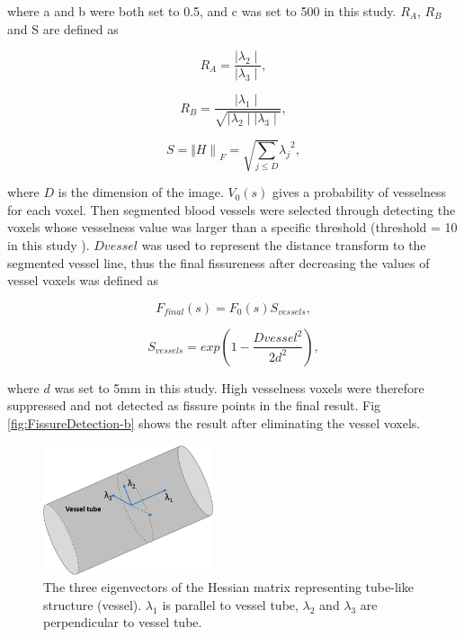{\noindent where a and b were both set to 0.5, and c was set to 500 in this study. $R_A$, $R_B$ and S are defined as

\begin{equation}
\label{eq:VesselHessian2}
R_A = \frac{\mid\lambda_{2}\mid}{\mid\lambda_{3}\mid}, 
\end{equation}

\begin{equation}
\label{eq:VesselHessian3}
R_B = \frac{\mid\lambda_{1}\mid}{\sqrt{\mid\lambda_{2}\mid \mid\lambda_{3}\mid}},
\end{equation}

\begin{equation}
\label{eq:VesselHessian3}
S = {\Vert H \rVert}_F = \sqrt{\sum_{j\leq D}}{\lambda_j}^2,
\end{equation}

\noindent where $D$ is the dimension of the image. $V_0(s)$ gives a probability of vesselness for each voxel. Then segmented blood vessels were selected through detecting the voxels whose vesselness value was larger than a specific threshold (threshold = 10 in this study \citep{frangi1998multiscale}). $D{vessel}$ was used to represent the distance transform to the segmented vessel line, thus the final fissureness after decreasing the values of vessel voxels was defined as

\begin{equation}
\label{eq:FinalFissureness}
F_{final}(s) = F_0(s)S_{vessels},
\end{equation}

\begin{equation}
\label{eq:FinalFissureness}
S_{vessels} = exp(1-\frac{{D{vessel}}^2}{2d^2}),
\end{equation}

\noindent  where $d$ was set to 5mm in this study. High vesselness voxels were therefore suppressed and not detected as fissure points in the final result. Fig \ref{fig:FissureDetection-b} shows the result after eliminating the vessel voxels.

\begin{figure}[htbp]
  \centering 
  \includegraphics[height=1.5in]{Segmentation/Image/VesselHessianEigenvector.png}
  \caption{The three eigenvectors of the Hessian matrix representing tube-like structure (vessel). $\lambda_1$ is parallel to vessel tube, $\lambda_2$  and $\lambda_3$ are perpendicular to vessel tube.}
  \label{fig:VesselHessianEigenvector}
\end{figure}

}
